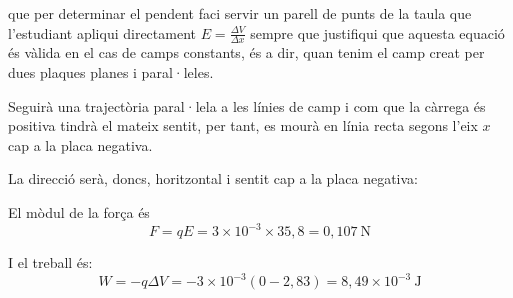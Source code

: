 \begin{solapartat}
 que per determinar el pendent faci servir un parell de punts de la taula  que l'estudiant apliqui directament $E = \frac{\Delta V}{\Delta x}$ sempre que justifiqui que aquesta equació és vàlida en el cas de camps constants, és a dir, quan tenim el camp creat per dues plaques planes i paral·leles.
\end{solapartat}

\begin{solapartat}
 Seguirà una trajectòria paral·lela a les línies de camp i com que la càrrega és positiva tindrà el mateix sentit, per tant, es mourà en línia recta segons l'eix $x$ cap a la placa negativa.

 La direcció serà, doncs, horitzontal i sentit cap a la placa negativa:


 El mòdul de la força és
\[ F = qE = 3\times 10^{-3}\times 35,8 = 0,107\ \mathrm{N} \]

 I el treball és:
\[ W = -q\Delta V = -3\times 10^{-3}(0 - 2,83) = 8,49\times 10^{-3}\ \mathrm{J} \]
\end{solapartat}
